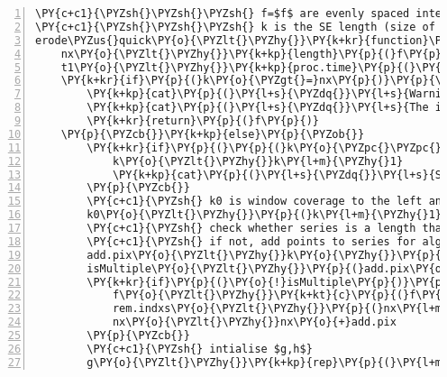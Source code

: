 \begin{Verbatim}[commandchars=\\\{\},codes={\catcode`\$=3\catcode`\^=7\catcode`\_=8},gobble=0,numbers=left,fontfamily=fvm,fontshape=n,fontsize=\footnotesize,tabsize=2]
\PY{c+c1}{\PYZsh{}\PYZsh{}\PYZsh{} f=$f$ are evenly spaced intensity values}
\PY{c+c1}{\PYZsh{}\PYZsh{}\PYZsh{} k is the SE length (size of $B$)}
erode\PYZus{}quick\PY{o}{\PYZlt{}\PYZhy{}}\PY{k+kr}{function}\PY{p}{(}f\PY{p}{,}k\PY{p}{)}\PY{p}{\PYZob{}}
	nx\PY{o}{\PYZlt{}\PYZhy{}}\PY{k+kp}{length}\PY{p}{(}f\PY{p}{)}
	t1\PY{o}{\PYZlt{}\PYZhy{}}\PY{k+kp}{proc.time}\PY{p}{(}\PY{p}{)}\PY{p}{[}\PY{l+m}{3}\PY{p}{]} \PY{c+c1}{\PYZsh{}\PYZsh{}\PYZsh{} get start time}
	\PY{k+kr}{if}\PY{p}{(}k\PY{o}{\PYZgt{}=}nx\PY{p}{)}\PY{p}{\PYZob{}}
		\PY{k+kp}{cat}\PY{p}{(}\PY{l+s}{\PYZdq{}}\PY{l+s}{Warning: structuring element is \PYZgt{}= in length as the input\PYZbs{}n\PYZdq{}}\PY{p}{)}
		\PY{k+kp}{cat}\PY{p}{(}\PY{l+s}{\PYZdq{}}\PY{l+s}{The input vector has been output \PYZbs{}n\PYZdq{}}\PY{p}{)}
		\PY{k+kr}{return}\PY{p}{(}f\PY{p}{)}
	\PY{p}{\PYZcb{}}\PY{k+kp}{else}\PY{p}{\PYZob{}}
		\PY{k+kr}{if}\PY{p}{(}\PY{p}{(}k\PY{o}{\PYZpc{}\PYZpc{}}\PY{l+m}{2}\PY{p}{)} \PY{o}{!=} \PY{l+m}{1}\PY{p}{)}\PY{p}{\PYZob{}}
			k\PY{o}{\PYZlt{}\PYZhy{}}k\PY{l+m}{\PYZhy{}1}
			\PY{k+kp}{cat}\PY{p}{(}\PY{l+s}{\PYZdq{}}\PY{l+s}{Structring Element not symmetric, using SE length \PYZhy{}1 =\PYZdq{}}\PY{p}{,}k\PY{p}{,}\PY{l+s}{\PYZdq{}}\PY{l+s}{\PYZbs{}n\PYZdq{}}\PY{p}{)}
		\PY{p}{\PYZcb{}}
		\PY{c+c1}{\PYZsh{} k0 is window coverage to the left and right of centre}
		k0\PY{o}{\PYZlt{}\PYZhy{}}\PY{p}{(}k\PY{l+m}{\PYZhy{}1}\PY{p}{)}\PY{o}{/}\PY{l+m}{2}
		\PY{c+c1}{\PYZsh{} check whether series is a length that is a multiple of k}
		\PY{c+c1}{\PYZsh{} if not, add points to series for algorithm then remove at end}
		add.pix\PY{o}{\PYZlt{}\PYZhy{}}k\PY{o}{\PYZhy{}}\PY{p}{(}nx\PY{o}{\PYZpc{}\PYZpc{}}k\PY{p}{)}
		isMultiple\PY{o}{\PYZlt{}\PYZhy{}}\PY{p}{(}add.pix\PY{o}{==}k\PY{p}{)}
		\PY{k+kr}{if}\PY{p}{(}\PY{o}{!}isMultiple\PY{p}{)}\PY{p}{\PYZob{}}
			f\PY{o}{\PYZlt{}\PYZhy{}}\PY{k+kt}{c}\PY{p}{(}f\PY{p}{,}\PY{k+kp}{rep}\PY{p}{(}\PY{o}{+}\PY{k+kc}{Inf}\PY{p}{,}add.pix\PY{p}{)}\PY{p}{)}
			rem.indxs\PY{o}{\PYZlt{}\PYZhy{}}\PY{p}{(}nx\PY{l+m}{+1}\PY{p}{)}\PY{o}{:}\PY{p}{(}nx\PY{o}{+}add.pix\PY{p}{)}
			nx\PY{o}{\PYZlt{}\PYZhy{}}nx\PY{o}{+}add.pix
		\PY{p}{\PYZcb{}}
		\PY{c+c1}{\PYZsh{} intialise $g,h$}
		g\PY{o}{\PYZlt{}\PYZhy{}}\PY{k+kp}{rep}\PY{p}{(}\PY{l+m}{0}\PY{p}{,}nx\PY{p}{)}\PY{p}{;} h\PY{o}{\PYZlt{}\PYZhy{}}\PY{k+kp}{rep}\PY{p}{(}\PY{l+m}{0}\PY{p}{,}nx\PY{p}{)}\PY{p}{;}

\end{Verbatim}
